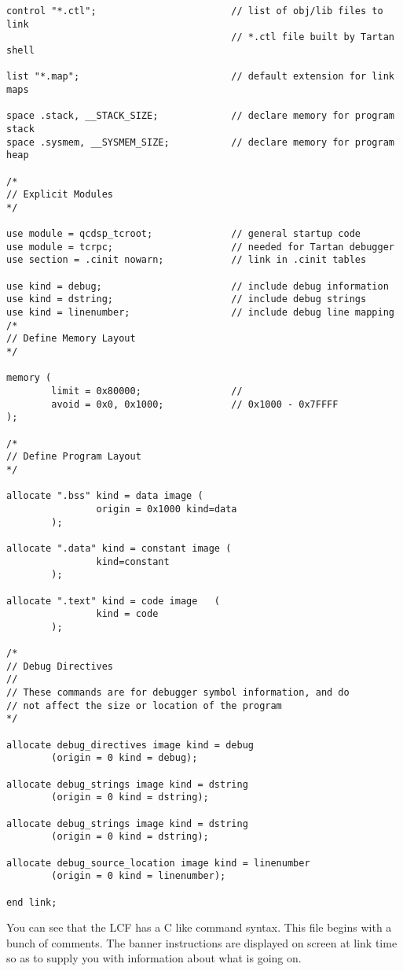 {\begin{verbatim}
control "*.ctl";                        // list of obj/lib files to link
                                        // *.ctl file built by Tartan shell

list "*.map";                           // default extension for link maps

space .stack, __STACK_SIZE;             // declare memory for program stack
space .sysmem, __SYSMEM_SIZE;           // declare memory for program heap

/*
// Explicit Modules
*/

use module = qcdsp_tcroot;              // general startup code
use module = tcrpc;                     // needed for Tartan debugger
use section = .cinit nowarn;            // link in .cinit tables

use kind = debug;                       // include debug information
use kind = dstring;                     // include debug strings
use kind = linenumber;                  // include debug line mapping
/*
// Define Memory Layout
*/

memory (
        limit = 0x80000;                //
        avoid = 0x0, 0x1000;            // 0x1000 - 0x7FFFF
);
 
/*
// Define Program Layout
*/

allocate ".bss" kind = data image (
                origin = 0x1000 kind=data
        );

allocate ".data" kind = constant image (
                kind=constant
        );

allocate ".text" kind = code image   (
                kind = code 
        );

/*
// Debug Directives
//
// These commands are for debugger symbol information, and do
// not affect the size or location of the program
*/

allocate debug_directives image kind = debug
        (origin = 0 kind = debug);

allocate debug_strings image kind = dstring
        (origin = 0 kind = dstring);

allocate debug_strings image kind = dstring
        (origin = 0 kind = dstring);

allocate debug_source_location image kind = linenumber
        (origin = 0 kind = linenumber);

end link;
\end{verbatim}
}
You can see that the LCF has a C like command syntax. This file begins
with a bunch of comments. The banner instructions are displayed on screen
at link time so as to supply you with information about what is going on.

